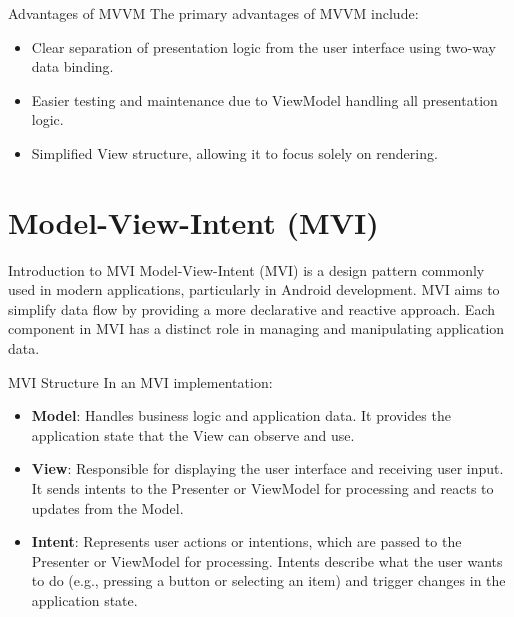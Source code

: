 \documentclass[aspectratio=169, table]{beamer}
\begin{document}
\begin{frame}[fragile]{Advantages of MVVM}
	\vspace{20pt}
	The primary advantages of MVVM include:
	\begin{itemize}
		\item Clear separation of presentation logic from the user interface using two-way data binding.
		\item Easier testing and maintenance due to ViewModel handling all presentation logic.
		\item Simplified View structure, allowing it to focus solely on rendering.
	\end{itemize}
\end{frame}

\section{Model-View-Intent (MVI)}

\begin{frame}[fragile]{Introduction to MVI}
	\vspace{20pt}
	Model-View-Intent (MVI) is a design pattern commonly used in modern applications, particularly in Android development. 
	MVI aims to simplify data flow by providing a more declarative and reactive approach. 
	Each component in MVI has a distinct role in managing and manipulating application data.
\end{frame}

\begin{frame}[fragile]{MVI Structure}
	\vspace{20pt}
	In an MVI implementation:
	\begin{itemize}
		\item \textbf{Model}: Handles business logic and application data. It provides the application state that the View can observe and use.
		\item \textbf{View}: Responsible for displaying the user interface and receiving user input. It sends intents to the Presenter or ViewModel for processing and reacts to updates from the Model.
		\item \textbf{Intent}: Represents user actions or intentions, which are passed to the Presenter or ViewModel for processing. Intents describe what the user wants to do (e.g., pressing a button or selecting an item) and trigger changes in the application state.
	\end{itemize}
\end{frame}
\end{document}
